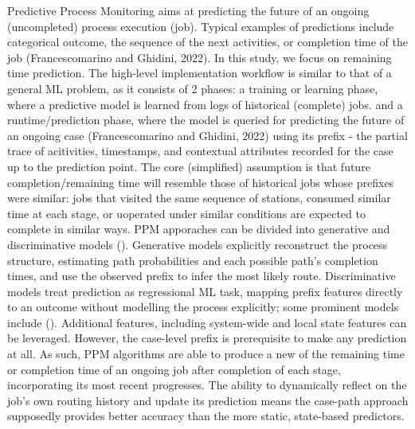 \documentclass[
]{ceurart}
\begin{document}
Predictive Process Monitoring aims at predicting the future of an ongoing (uncompleted) process execution (job). Typical examples of predictions include 
categorical outcome, the sequence of the next activities, or completion time of the job (Francescomarino and Ghidini, 2022). In this study, we focus on remaining time prediction. The high-level implementation workflow is similar to that of a general ML 
problem, as it consists of 2 phases: 
a training or learning phase, where a predictive model is learned from logs of historical (complete) jobs. 
and a runtime/prediction phase, where the model is queried for predicting the future of an ongoing case (Francescomarino and Ghidini, 2022) using its prefix - the partial trace of acitivities, timestamps, and contextual attributes
recorded for the case up to the prediction point. 
The core (simplified) assumption is that future completion/remaining time will resemble those of historical jobs whose prefixes were similar: 
jobs that visited the same sequence of stations, consumed similar time at each stage, or uoperated under similar conditions are expected to complete in similar ways.
PPM apporaches can be divided into generative and discriminative models (). Generative models explicitly reconstruct the process structure, estimating path probabilities and each possible path's completion times, and use the observed 
prefix to infer the most likely route. Discriminative models treat prediction as regressional ML task, mapping prefix features directly to an outcome without modelling the process explicitly; some prominent models include (). Additional features, including
system-wide and local state features can be leveraged. However, the case-level prefix is prerequisite to make any prediction at all. As such, PPM algorithms are able to produce a new of the remaining time or completion time of an
ongoing job after completion of each stage, incorporating its most recent progresses. The ability to dynamically reflect on the job's own routing history and update its prediction means the case-path approach supposedly provides
better accuracy than the more static, state-based predictors.


\end{document}
